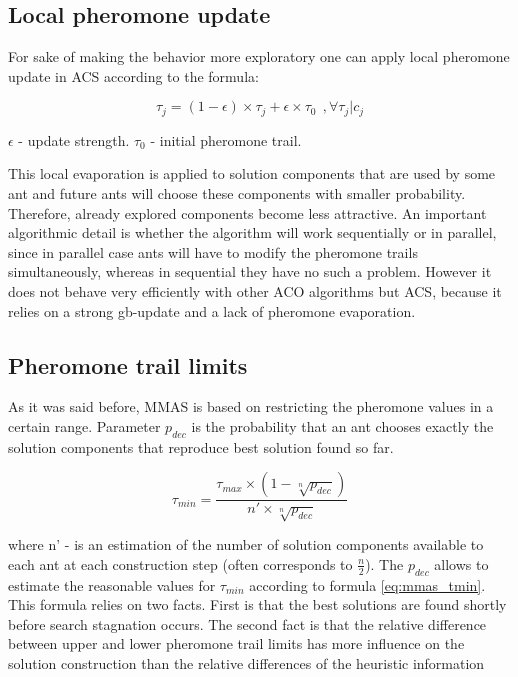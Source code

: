 \documentclass[11pt,a4paper,oneside]{book}
\begin{document}
\subsection{Local pheromone update}
For sake of making the behavior more exploratory one can apply \cite{coop_tsp} local pheromone update in ACS according to the formula:

\begin{equation}
\tau_j = (1 - \epsilon) \times \tau_j + \epsilon \times \tau_0 \ \ ,\forall \tau_j | c_j
\label{eq:local_update}
\end{equation}

$\epsilon$ - update strength. $\tau_0$ - initial pheromone trail.

This local evaporation is applied to solution components that are used by some ant and future ants will choose these components with smaller probability. Therefore, already explored components become less attractive. An important algorithmic detail is whether the algorithm will work sequentially or in parallel, since in parallel case ants will have to modify the pheromone trails simultaneously, whereas in sequential they have no such a problem. However it does not behave very efficiently with other ACO algorithms but ACS, because it relies on a strong gb-update and a lack of pheromone evaporation.

\subsection{Pheromone trail limits}
As it was said before, MMAS is based on restricting the pheromone values in a certain range. Parameter $p_{dec}$ is the probability that an ant chooses exactly the solution components that reproduce best solution found so far.

\begin{equation}
\tau_{min} = \frac{\tau_{max} \times (1 - \sqrt[n]{p_{dec}})}{n' \times \sqrt[n]{p_{dec}}} 
\label{eq:mmas_tmin}
\end{equation}

where n' - is an estimation of the number of solution components available to each ant at each construction step (often corresponds to $\frac{n}{2}$). The $p_{dec}$ allows to estimate the reasonable values for $\tau_{min}$ according to formula \ref{eq:mmas_tmin}. This formula relies on two facts. First is that the best solutions are found shortly before search stagnation occurs. The second fact is that the relative difference between upper and lower pheromone trail limits has more influence on the solution construction than the relative differences of the heuristic information
\end{document}
